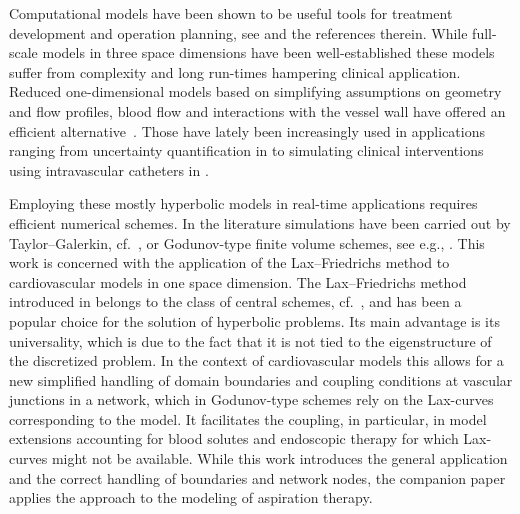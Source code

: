 \documentclass[a4paper,11pt]{article}
\begin{document}
  Computational models have been shown to be useful tools for treatment development and operation planning, see \cite{crosetto2011fluid, neidlin2016investhemo} and the references therein. While full-scale models in three space dimensions have been well-established \cite{nobile2008robin} these models suffer from complexity and long run-times hampering clinical application. Reduced one-dimensional models based on simplifying assumptions on geometry and flow profiles, blood flow and interactions with the vessel wall have offered an efficient alternative~\cite{hughes1973,formaggia2003}. Those have lately been increasingly used in applications ranging from uncertainty quantification in \cite{fleeter2020multil} to simulating clinical interventions using intravascular catheters in \cite{benemerito2023,pradhan2024}.

  Employing these mostly hyperbolic models in real-time applications requires efficient numerical schemes. In the literature simulations have been carried out by Taylor--Galerkin, cf.\ \cite{donea1984time}, or Godunov-type finite volume schemes, see e.g., \cite{melis2019improved,xiaofei2015verif,formaggia2006,peiro2009reduc}. This work is concerned with the application of the Lax--Friedrichs method to cardiovascular models in one space dimension. The Lax--Friedrichs method introduced in \cite{friedrichs1971system} belongs to the class of central schemes, cf.\ \cite{kurganov2000newhighresol}, and has been a popular choice for the solution of hyperbolic problems. Its main advantage is its universality, which is due to the fact that it is not tied to the eigenstructure of the discretized problem. In the context of cardiovascular models this allows for a new simplified handling of domain boundaries and coupling conditions at vascular junctions in a network, which in Godunov-type schemes rely on the Lax-curves corresponding to the model. It facilitates the coupling, in particular, in model extensions accounting for blood solutes and endoscopic therapy for which Lax-curves might not be available. While this work introduces the general application and the correct handling of boundaries and network nodes, the companion paper \cite{herty2024} applies the approach to the modeling of aspiration therapy.     
\end{document}
